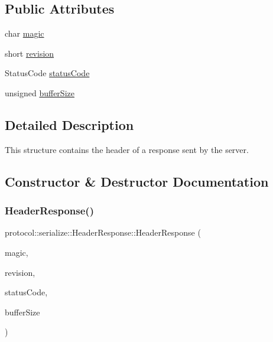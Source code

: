 \subsection*{Public Attributes}
\begin{DoxyCompactItemize}
\item 
char \hyperlink{structprotocol_1_1serialize_1_1_header_response_adcf0f736dcd6535a49c4373cccb146a1}{magic}
\item 
short \hyperlink{structprotocol_1_1serialize_1_1_header_response_a9dcd816424a4a3c3504c9fbf242c4eaa}{revision}
\item 
Status\+Code \hyperlink{structprotocol_1_1serialize_1_1_header_response_aee1d562d973f3d653927252e1fe4135d}{status\+Code}
\item 
unsigned \hyperlink{structprotocol_1_1serialize_1_1_header_response_a30b58c44566a0125f58e6e7ca4ebaf11}{buffer\+Size}
\end{DoxyCompactItemize}


\subsection{Detailed Description}
This structure contains the header of a response sent by the server. 

\subsection{Constructor \& Destructor Documentation}
\mbox{\label{structprotocol_1_1serialize_1_1_header_response_a8216e5e37cc68ff29d47d6c1750a4ff3}} 
\subsubsection{\texorpdfstring{Header\+Response()}{HeaderResponse()}\hspace{0.1cm}{\footnotesize\ttfamily [1/2]}}
{\footnotesize\ttfamily protocol\+::serialize\+::\+Header\+Response\+::\+Header\+Response (\begin{DoxyParamCaption}\item[{char}]{magic,  }\item[{short}]{revision,  }\item[{Status\+Code}]{status\+Code,  }\item[{unsigned}]{buffer\+Size }\end{DoxyParamCaption})}



